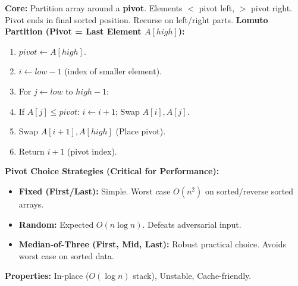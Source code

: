\documentclass[11pt]{article}
\begin{document}
\begin{methode}
    \textbf{Core:} Partition array around a \textbf{pivot}. Elements $<$ pivot left, $>$ pivot right. Pivot ends in final sorted position. Recurse on left/right parts.
    \textbf{Lomuto Partition (Pivot = Last Element $A[high]$):}
    \begin{enumerate}
        \item $pivot \leftarrow A[high]$.
        \item $i \leftarrow low - 1$ (index of smaller element).
        \item For $j \leftarrow low$ to $high-1$:
            \item If $A[j] \le pivot$: $i \leftarrow i+1$; Swap $A[i], A[j]$.
        \item Swap $A[i+1], A[high]$ (Place pivot).
        \item Return $i+1$ (pivot index).
    \end{enumerate}
    \textbf{Pivot Choice Strategies (Critical for Performance):}
    \begin{itemize}
        \item \textbf{Fixed (First/Last):} Simple. Worst case $O(n^2)$ on sorted/reverse sorted arrays.
        \item \textbf{Random:} Expected $O(n \log n)$. Defeats adversarial input.
        \item \textbf{Median-of-Three (First, Mid, Last):} Robust practical choice. Avoids worst case on sorted data.
    \end{itemize}
    \textbf{Properties:} In-place ($O(\log n)$ stack), Unstable, Cache-friendly.
\end{methode}
\end{document}
